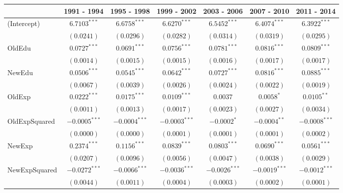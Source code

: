 
\begin{table}
\begin{center}
\begin{small}
\begin{tabular}{l c c c c c c }
\hline
 & 1991 - 1994 & 1995 - 1998 & 1999 - 2002 & 2003 - 2006 & 2007 - 2010 & 2011 - 2014 \\
\hline
(Intercept)     & $6.7103^{***}$  & $6.6758^{***}$  & $6.6270^{***}$  & $6.5452^{***}$  & $6.4074^{***}$  & $6.3922^{***}$  \\
                & $(0.0241)$      & $(0.0296)$      & $(0.0282)$      & $(0.0314)$      & $(0.0319)$      & $(0.0295)$      \\
OldEdu          & $0.0727^{***}$  & $0.0691^{***}$  & $0.0756^{***}$  & $0.0781^{***}$  & $0.0816^{***}$  & $0.0809^{***}$  \\
                & $(0.0014)$      & $(0.0015)$      & $(0.0015)$      & $(0.0016)$      & $(0.0017)$      & $(0.0017)$      \\
NewEdu          & $0.0506^{***}$  & $0.0545^{***}$  & $0.0642^{***}$  & $0.0727^{***}$  & $0.0816^{***}$  & $0.0885^{***}$  \\
                & $(0.0067)$      & $(0.0039)$      & $(0.0026)$      & $(0.0024)$      & $(0.0022)$      & $(0.0019)$      \\
OldExp          & $0.0222^{***}$  & $0.0175^{***}$  & $0.0109^{***}$  & $0.0037$        & $0.0058^{*}$    & $0.0105^{**}$   \\
                & $(0.0011)$      & $(0.0013)$      & $(0.0017)$      & $(0.0023)$      & $(0.0027)$      & $(0.0034)$      \\
OldExpSquared   & $-0.0005^{***}$ & $-0.0004^{***}$ & $-0.0003^{***}$ & $-0.0002^{*}$   & $-0.0004^{**}$  & $-0.0008^{***}$ \\
                & $(0.0000)$      & $(0.0000)$      & $(0.0001)$      & $(0.0001)$      & $(0.0001)$      & $(0.0002)$      \\
NewExp          & $0.2374^{***}$  & $0.1156^{***}$  & $0.0839^{***}$  & $0.0803^{***}$  & $0.0690^{***}$  & $0.0561^{***}$  \\
                & $(0.0207)$      & $(0.0096)$      & $(0.0056)$      & $(0.0047)$      & $(0.0038)$      & $(0.0029)$      \\
NewExpSquared   & $-0.0272^{***}$ & $-0.0066^{***}$ & $-0.0036^{***}$ & $-0.0026^{***}$ & $-0.0019^{***}$ & $-0.0012^{***}$ \\
                & $(0.0044)$      & $(0.0011)$      & $(0.0004)$      & $(0.0003)$      & $(0.0002)$      & $(0.0001)$      \\

\end{tabular}
\end{small}
\end{center}
\end{table}
